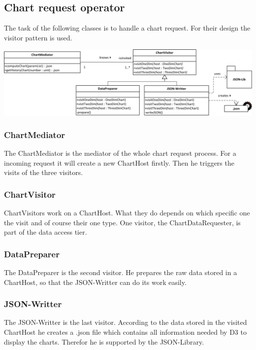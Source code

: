 \subsection{Chart request operator}
The task of the following classes is to handle a chart request. For their design the visitor pattern
is used. 

\begin{center}
\includegraphics[width=1\linewidth]{Pictures/Parts/MediVisi.png}
\end{center}  

\subsubsection*{ChartMediator}
The ChartMediator is the mediator of the whole chart request process. For a incoming request it will create a new
ChartHost firstly. Then he triggers the visits of the three visitors. 


\subsubsection*{ChartVisitor}
ChartVisitors work on a ChartHost. What they do depends on which specific one the visit and of course their
one type. One visitor, the ChartDataRequester, is part of the data access tier.

\subsubsection*{DataPreparer}
The DataPreparer is the second visitor. He prepares the raw data stored in a ChartHost, so that the JSON-Writter
can do its work easily.

\subsubsection*{JSON-Writter}
The JSON-Writter is the last visitor. According to the data stored in the visited ChartHost he creates a .json file
which contains all information needed by D3 to display the charts. Therefor he is supported by the JSON-Library.


